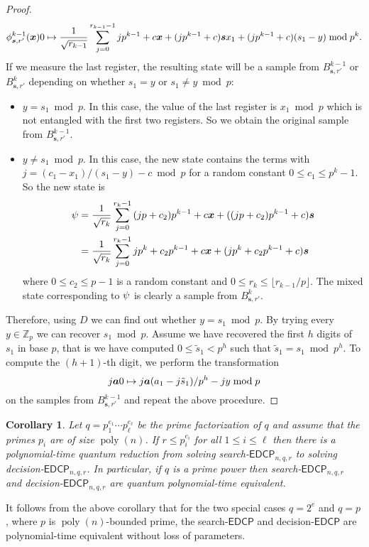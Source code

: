 \documentclass[11pt]{article}
\theoremstyle{plain}
\newtheorem{corollary}[theorem]{Corollary}
\theoremstyle{definition}
\DeclareMathOperator{\poly}{poly}
\let\ket\relax
\DeclarePairedDelimiter{\ket}{\lvert}{\rangle}
\def\Z{\mathbb{Z}}
\def\edcp{\mathsf{EDCP}}
\begin{document}
\begin{proof}
    \[ \ket{\phi_{\bm{s}, r'}^{k - 1}(\bm{x})}\ket{0} \mapsto \frac{1}{\sqrt{r_{k - 1}}} \sum_{j = 0}^{r_{k - 1} - 1} \ket{jp^{k - 1} + c}\ket{\bm{x} + (jp^{k - 1} + c)\bm{s}}\ket{x_1 + (jp^{k - 1} + c)(s_1 - y) \bmod p^k}. \]
    If we measure the last register, the resulting state will be a sample from $B_{\bm{s}, r'}^{k - 1}$ or $B_{\bm{s}, r'}^k$ depending on whether $s_1 = y$ or $s_1 \ne y \bmod p$:
    \begin{itemize}
    \item $y = s_1 \bmod p$. In this case, the value of the last register is $x_1 \bmod p$ which is not entangled with the first two registers. So we obtain the original sample from $B_{\bm{s}, r'}^{k - 1}$.
    \item $y \ne s_1 \bmod p$. In this case, the new state contains the terms with $j = (c_1 - x_1) / (s_1 - y) - c \bmod p$ for a random constant $0 \le c_1 \le p^k - 1$. So the new state is
    \begin{align*}
        \ket{\psi}
        & = \frac{1}{\sqrt{r_k}} \sum_{j = 0}^{r_k - 1} \ket{(jp + c_2)p^{k - 1} + c}\ket{\bm{x} + ((jp + c_2)p^{k - 1} + c)\bm{s}} \\
        & = \frac{1}{\sqrt{r_k}} \sum_{j = 0}^{r_k - 1} \ket{jp^k + c_2p^{k - 1} + c}\ket{\bm{x} + (jp^k + c_2p^{k - 1} + c)\bm{s}}
    \end{align*}
    where $0 \le c_2 \le p - 1$ is a random constant and $0 \le r_k \le \lfloor r_{k - 1} / p \rfloor$. The mixed state corresponding to $\ket{\psi}$ is clearly a sample from $B_{\bm{s}, r'}^k$.
    \end{itemize}
    Therefore, using $D$ we can find out whether $y = s_1 \bmod p$. By trying every $y \in \Z_p$ we can recover $s_1 \bmod p$. Assume we have recovered the first $h$ digits of $s_1$ in base $p$, that is we have computed $0 \le \tilde{s}_1 < p^h$ such that $\tilde{s}_1 = s_1 \bmod p^h$. To compute the $(h + 1)$-th digit, we perform the transformation
    \[ \ket{j}\ket{\bm{a}}\ket{0} \mapsto \ket{j}\ket{\bm{a}}\ket{(a_1 - j\tilde{s}_1) / p^h - jy \bmod p}  \]
    on the samples from $B_{\bm{s}, r'}^{k - 1}$ and repeat the above procedure.
\end{proof}
\begin{corollary}
    Let $q = p_1^{e_1} \cdots p_\ell^{e_\ell}$ be the prime factorization of $q$ and assume that the primes $p_i$ are of size $\poly(n)$. If $r \le p_i^{e_i}$ for all $1 \le i \le \ell$ then there is a polynomial-time quantum reduction from solving search-$\edcp_{n, q, r}$ to solving decision-$\edcp_{n, q, r}$. In particular, if $q$ is a prime power then search-$\edcp_{n, q, r}$ and decision-$\edcp_{n, q, r}$ are quantum polynomial-time equivalent.
\end{corollary}
It follows from the above corollary that for the two special cases $q = 2^e$ and $q = p$, where $p$ is $\poly(n)$-bounded prime, the search-$\edcp$ and decision-$\edcp$ are polynomial-time equivalent without loss of parameters. 
\end{document}

